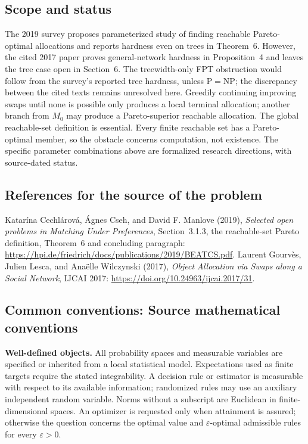 \documentclass[11pt,a4paper]{article}
\begin{document}
\subsection*{Scope and status}
The 2019 survey proposes parameterized study of finding reachable Pareto-optimal allocations and reports hardness even on trees in Theorem~6. However, the cited 2017 paper proves general-network hardness in Proposition~4 and leaves the tree case open in Section~6. The treewidth-only FPT obstruction would follow from the survey's reported tree hardness, unless $\mathrm P=\mathrm{NP}$; the discrepancy between the cited texts remains unresolved here. Greedily continuing improving swaps until none is possible only produces a local terminal allocation; another branch from $M_0$ may produce a Pareto-superior reachable allocation. The global reachable-set definition is essential. Every finite reachable set has a Pareto-optimal member, so the obstacle concerns computation, not existence. The specific parameter combinations above are formalized research directions, with source-dated status.
\subsection*{References for the source of the problem}
Katar\'ina Cechl\'arov\'a, \'Agnes Cseh, and David F. Manlove (2019), \emph{Selected open problems in Matching Under Preferences}, Section~3.1.3, the reachable-set Pareto definition, Theorem~6 and concluding paragraph: \url{https://hpi.de/friedrich/docs/publications/2019/BEATCS.pdf}. Laurent Gourv\`es, Julien Lesca, and Ana\"elle Wilczynski (2017), \emph{Object Allocation via Swaps along a Social Network}, IJCAI 2017: \url{https://doi.org/10.24963/ijcai.2017/31}.

\subsection*{Common conventions: Source mathematical conventions}

\textbf{Well-defined objects.}
All probability spaces and measurable variables are specified or inherited
from a local statistical model. Expectations used as finite targets require
the stated integrability. A decision rule or estimator is measurable with
respect to its available information; randomized rules may use an auxiliary
independent random variable. Norms without a subscript are Euclidean in
finite-dimensional spaces. An optimizer is requested only when attainment
is assured; otherwise the question concerns the optimal value and
$\varepsilon$-optimal admissible rules for every $\varepsilon>0$.
\end{document}
